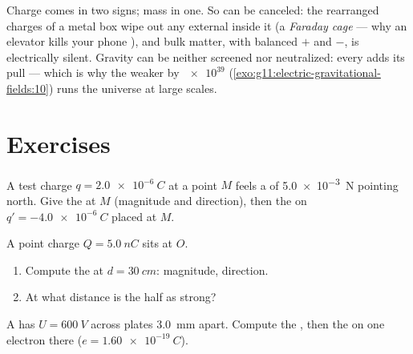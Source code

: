 \begin{remark}\label{rem:g11:electric-gravitational-fields:noanalogue}
Charge comes in two signs; mass in one. So  can be
canceled: the rearranged charges of a metal box wipe out any external
 inside it (a \emph{Faraday cage} --- why an elevator kills your
phone ), and bulk matter, with balanced $+$ and $-$, is
electrically silent. Gravity can be neither screened nor neutralized:
every  adds its pull --- which is why the  weaker by
$\num{e39}$ (\cref{exo:g11:electric-gravitational-fields:10}) runs the
universe at large scales.
\end{remark}

\section{Exercises}

\begin{exercise}[$\star$]\label{exo:g11:electric-gravitational-fields:1}
A test charge $q = \qty{+2.0e-6}{C}$ at a point $M$ feels a  of
\qty{5.0e-3}{N} pointing north. Give the  at $M$ (magnitude and
direction), then the  on $q' = \qty{-4.0e-6}{C}$ placed at $M$.
\end{exercise}

\begin{exercise}[$\star$]\label{exo:g11:electric-gravitational-fields:2}
A point charge $Q = \qty{+5.0}{nC}$ sits at $O$.
\begin{enumerate}
  \item Compute the  at $d = \qty{30}{cm}$: magnitude, direction.
  \item At what distance is the  half as strong?
\end{enumerate}
\end{exercise}

\begin{exercise}[$\star$]\label{exo:g11:electric-gravitational-fields:3}
A  has $U = \qty{600}{V}$ across plates \qty{3.0}{mm} apart.
Compute the , then the  on one electron there
($e = \qty{1.60e-19}{C}$).
\end{exercise}

